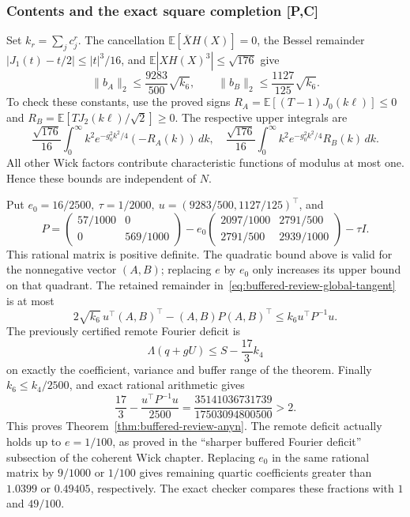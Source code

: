 \subsubsection{Contents and the exact square completion \textbf{[P,C]}}
Set \(k_r=\sum_jc_j^r\).  The cancellation
\(\mathbb E[\overline X H(X)]=0\), the Bessel remainder
\(|J_1(t)-t/2|\le |t|^3/16\), and
\(\mathbb E|XH(X)^3|\le\sqrt{176}\) give
\[
 \|b_A\|_2\le \frac{9283}{500}\sqrt{k_6},\qquad
 \|b_B\|_2\le \frac{1127}{125}\sqrt{k_6}.
 \tag{**}
\]
To check these constants, use the proved signs
\(R_A=\mathbb E[(T-1)J_0(k\ell)]\le0\) and
\(R_B=\mathbb E[TJ_2(k\ell)/\sqrt2]\ge0\).
The respective upper integrals are
\[
 \frac{\sqrt{176}}{16}\int_0^\infty k^2e^{-g_0^2k^2/4}
                  (-R_A(k))\,dk,\quad
 \frac{\sqrt{176}}{16}\int_0^\infty k^2e^{-g_0^2k^2/4}
                  R_B(k)\,dk.
\]
All other Wick factors contribute characteristic functions of modulus
at most one. Hence these bounds are independent of \(N\).

Put \(e_0=16/2500,\ \tau=1/2000,\ u=(9283/500,1127/125)^\top\), and
\[
 P=
 \begin{pmatrix}57/1000&0\\0&569/1000\end{pmatrix}
 -e_0
 \begin{pmatrix}2097/1000&2791/500\\2791/500&2939/1000\end{pmatrix}
 -\tau I .
\]
This rational matrix is positive definite. The quadratic bound
above is valid for the nonnegative vector \((A,B)\); replacing \(e\)
by \(e_0\) only increases its upper bound on that quadrant.
The retained remainder in~\eqref{eq:buffered-review-global-tangent}
is at most
\[
 2\sqrt{k_6}\,u^\top(A,B)^\top-(A,B)P(A,B)^\top
 \le k_6u^\top P^{-1}u.
\]
The previously certified remote Fourier deficit is
\[
 \Lambda(q+gU)\le S-\frac{17}{3}k_4
\]
on exactly the coefficient, variance and buffer range of the theorem.
Finally \(k_6\le k_4/2500\), and exact rational arithmetic gives
\[
 \frac{17}{3}-\frac{u^\top P^{-1}u}{2500}
 =\frac{35141036731739}{17503094800500}>2.
\]
This proves Theorem~\ref{thm:buffered-review-anyn}.
The remote deficit actually holds up to \(e=1/100\), as proved in
the ``sharper buffered Fourier deficit'' subsection of the coherent
Wick chapter. Replacing \(e_0\) in the same rational matrix by
\(9/1000\) or \(1/100\) gives remaining quartic coefficients greater
than \(1.0399\) or \(0.49405\), respectively. The exact checker
compares these fractions with \(1\) and \(49/100\).

